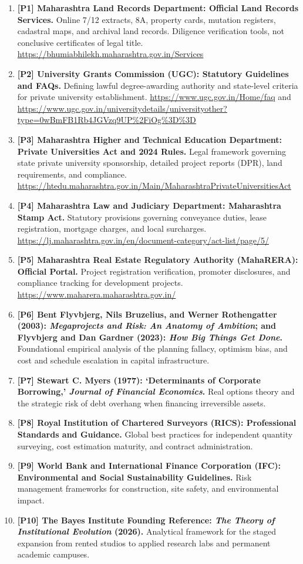 \begin{enumerate}
    \item \textbf{[P1] Maharashtra Land Records Department: Official Land Records Services.} Online 7/12 extracts, 8A, property cards, mutation registers, cadastral maps, and archival land records. Diligence verification tools, not conclusive certificates of legal title. \url{https://bhumiabhilekh.maharashtra.gov.in/Services}
    \item \textbf{[P2] University Grants Commission (UGC): Statutory Guidelines and FAQs.} Defining lawful degree-awarding authority and state-level criteria for private university establishment. \url{https://www.ugc.gov.in/Home/faq} and \url{https://www.ugc.gov.in/universitydetails/universityother?type=0wBmFB1Rb4JGVzq9UP%2FiOg%3D%3D}
    \item \textbf{[P3] Maharashtra Higher and Technical Education Department: Private Universities Act and 2024 Rules.} Legal framework governing state private university sponsorship, detailed project reports (DPR), land requirements, and compliance. \url{https://htedu.maharashtra.gov.in/Main/MaharashtraPrivateUniversitiesAct}
    \item \textbf{[P4] Maharashtra Law and Judiciary Department: Maharashtra Stamp Act.} Statutory provisions governing conveyance duties, lease registration, mortgage charges, and local surcharges. \url{https://lj.maharashtra.gov.in/en/document-category/act-list/page/5/}
    \item \textbf{[P5] Maharashtra Real Estate Regulatory Authority (MahaRERA): Official Portal.} Project registration verification, promoter disclosures, and compliance tracking for development projects. \url{https://www.maharera.maharashtra.gov.in/}
    \item \textbf{[P6] Bent Flyvbjerg, Nils Bruzelius, and Werner Rothengatter (2003): \textit{Megaprojects and Risk: An Anatomy of Ambition}; and Flyvbjerg and Dan Gardner (2023): \textit{How Big Things Get Done}.} Foundational empirical analysis of the planning fallacy, optimism bias, and cost and schedule escalation in capital infrastructure.
    \item \textbf{[P7] Stewart C. Myers (1977): `Determinants of Corporate Borrowing,' \textit{Journal of Financial Economics}.} Real options theory and the strategic risk of debt overhang when financing irreversible assets.
    \item \textbf{[P8] Royal Institution of Chartered Surveyors (RICS): Professional Standards and Guidance.} Global best practices for independent quantity surveying, cost estimation maturity, and contract administration.
    \item \textbf{[P9] World Bank and International Finance Corporation (IFC): Environmental and Social Sustainability Guidelines.} Risk management frameworks for construction, site safety, and environmental impact.
    \item \textbf{[P10] The Bayes Institute Founding Reference: \textit{The Theory of Institutional Evolution} (2026).} Analytical framework for the staged expansion from rented studios to applied research labs and permanent academic campuses.
\end{enumerate}

